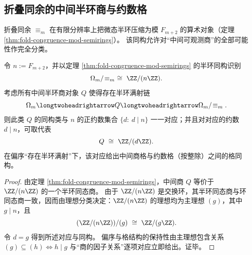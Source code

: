 \subsection{折叠同余的中间半环商与约数格}\label{subsec:fold-intermediate-semirings-divisor-lattice}
折叠同余 \(\equiv_m\) 在有限分辨率上把微态半环压缩为模 \(F_{m+2}\) 的算术对象（定理 \ref{thm:fold-congruence-mod-semirings}）。
该同构允许对“中间可观测商”的全部可能性作完全分类。

\begin{proposition}\label{prop:fold-intermediate-semirings-divisor-lattice}
令 \(n:=F_{m+2}\)，并以定理 \ref{thm:fold-congruence-mod-semirings} 的半环同构识别
\[
\Omega_m/\!\equiv_m\ \cong\ \ZZ/(n\ZZ).
\]
考虑所有中间半环商对象 \(Q\) 使得存在半环满射链
\[
\Omega_m\longtwoheadrightarrow Q\longtwoheadrightarrow \Omega_m/\!\equiv_m.
\]
则此类 \(Q\) 的同构类与 \(n\) 的正约数集合 \(\{d:\ d\mid n\}\) 一一对应；并且对对应的约数 \(d\mid n\)，可取代表
\[
Q\ \cong\ \ZZ/(d\ZZ).
\]
在偏序“存在半环满射”下，该对应给出中间商格与约数格（按整除）之间的格同构。
\end{proposition}
\begin{proof}
由定理 \ref{thm:fold-congruence-mod-semirings}，中间商 \(Q\) 等价于 \(\ZZ/(n\ZZ)\) 的一个半环同态商。
由于 \(\ZZ/(n\ZZ)\) 是交换环，其半环同态商与环同态商一致，因而由理想分类决定：\(\ZZ/(n\ZZ)\) 的理想均为主理想 \((g)\)，其中 \(g\mid n\)，且
\[
(\ZZ/(n\ZZ))/(g)\ \cong\ \ZZ/(g\ZZ).
\]
令 \(d=g\) 得到所述对应与同构。
偏序与格结构的保持性由主理想包含关系 \((g)\subseteq (h)\iff h\mid g\) 与“商的因子关系”逐项对应立即给出。证毕。
\end{proof}

